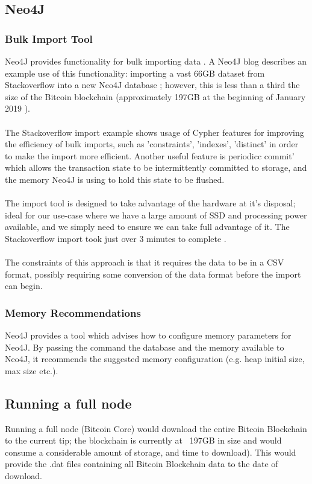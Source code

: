 \subsection{Neo4J}

\subsubsection{Bulk Import Tool}
Neo4J provides functionality for bulk importing data \cite{RefWorks:doc:5c6ab610e4b02c4a19ae3ed1}. A Neo4J blog describes an example use of this functionality: importing a  vast 66GB dataset from Stackoverflow into a new Neo4J database \cite{RefWorks:doc:5c6ab2bae4b08c9b85da964f}; however, this is less than a third the size of the Bitcoin blockchain (approximately 197GB at the beginning of January 2019 \cite{RefWorks:doc:5c6ab1a3e4b05e3aaec0ffc8}).
\\\\ 
The Stackoverflow import example shows usage of Cypher features for improving the efficiency of bulk imports, such as 'constraints', 'indexes', 'distinct'  in order to make the import more efficient. Another useful feature is periodicc commit' which allows the transaction state to be intermittently committed to storage, and the memory Neo4J is using to hold this state to be flushed. 
\\\\
The import tool is designed to take advantage of the hardware at it's disposal; ideal for our use-case where we have a large amount of SSD and processing power available, and we simply need to ensure we can take full advantage of it. The Stackoverflow import took just over 3 minutes to complete \cite{RefWorks:doc:5c6ab2bae4b08c9b85da964f}. 
\\\\
The constraints of this approach is that it requires the data to be in a CSV format, possibly requiring some conversion of the data format before the import can begin. 

\subsubsection{Memory Recommendations}
Neo4J provides a tool which advises how to configure memory parameters for Neo4J. By passing the command the database and the memory available to Neo4J, it recommends the suggested memory configuration (e.g. heap initial size, max size etc.). 

\subsection{Running a full node}
Running a full node (Bitcoin Core) would download the entire Bitcoin Blockchain to the current tip; the blockchain is currently at ~197GB\cite{RefWorks:doc:5c6ab1a3e4b05e3aaec0ffc8} in size and would consume a considerable amount of storage, and time to download). This would provide the .dat files containing all Bitcoin Blockchain data to the date of download. 


